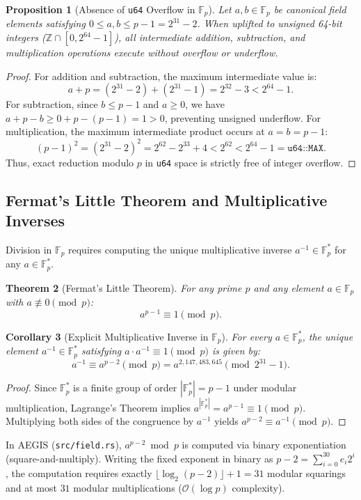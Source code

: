 \documentclass[11pt,a4paper]{article}
\newtheorem{theorem}{Theorem}[section]
\newtheorem{proposition}[theorem]{Proposition}
\newtheorem{corollary}[theorem]{Corollary}
\theoremstyle{definition}
\newcommand{\Fp}{\mathbb{F}_p}
\newcommand{\Fps}{\mathbb{F}_p^*}
\newcommand{\Z}{\mathbb{Z}}
\begin{document}
\begin{proposition}[Absence of \texttt{u64} Overflow in $\Fp$]
Let $a, b \in \Fp$ be canonical field elements satisfying $0 \le a, b \le p - 1 = 2^{31} - 2$. When uplifted to unsigned 64-bit integers ($\Z \cap [0, 2^{64}-1]$), all intermediate addition, subtraction, and multiplication operations execute without overflow or underflow.
\end{proposition}
\begin{proof}
For addition and subtraction, the maximum intermediate value is:
\[
    a + p = (2^{31} - 2) + (2^{31} - 1) = 2^{32} - 3 < 2^{64} - 1.
\]
For subtraction, since $b \le p - 1$ and $a \ge 0$, we have $a + p - b \ge 0 + p - (p - 1) = 1 > 0$, preventing unsigned underflow.
For multiplication, the maximum intermediate product occurs at $a = b = p - 1$:
\[
    (p - 1)^2 = (2^{31} - 2)^2 = 2^{62} - 2^{33} + 4 < 2^{62} < 2^{64} - 1 = \texttt{u64::MAX}.
\]
Thus, exact reduction modulo $p$ in \texttt{u64} space is strictly free of integer overflow.
\end{proof}

\subsection{Fermat's Little Theorem and Multiplicative Inverses}
Division in $\Fp$ requires computing the unique multiplicative inverse $a^{-1} \in \Fps$ for any $a \in \Fps$.

\begin{theorem}[Fermat's Little Theorem]
For any prime $p$ and any element $a \in \Fp$ with $a \not\equiv 0 \pmod p$:
\[
    a^{p-1} \equiv 1 \pmod p.
\]
\end{theorem}

\begin{corollary}[Explicit Multiplicative Inverse in $\Fp$]
For every $a \in \Fps$, the unique element $a^{-1} \in \Fps$ satisfying $a \cdot a^{-1} \equiv 1 \pmod p$ is given by:
\[
    a^{-1} \equiv a^{p-2} \pmod p = a^{2,147,483,645} \pmod{2^{31}-1}.
\]
\end{corollary}
\begin{proof}
Since $\Fps$ is a finite group of order $|\Fps| = p - 1$ under modular multiplication, Lagrange's Theorem implies $a^{|\Fps|} = a^{p-1} \equiv 1 \pmod p$. Multiplying both sides of the congruence by $a^{-1}$ yields $a^{p-2} \equiv a^{-1} \pmod p$.
\end{proof}

In AEGIS (\texttt{src/field.rs}), $a^{p-2} \bmod p$ is computed via binary exponentiation (square-and-multiply). Writing the fixed exponent in binary as $p - 2 = \sum_{i=0}^{30} e_i 2^i$, the computation requires exactly $\lfloor \log_2(p-2) \rfloor + 1 = 31$ modular squarings and at most $31$ modular multiplications ($\mathcal{O}(\log p)$ complexity).
\end{document}
